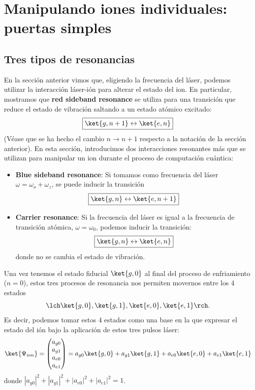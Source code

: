 \section{Manipulando iones individuales: puertas simples} \label{sec_ions_single_ion}

\subsection{Tres tipos de resonancias}

En la sección anterior vimos que, eligiendo la frecuencia del láser, podemos utilizar la interacción láser-ión para alterar el estado del ion. En particular, mostramos que \textbf{red sideband resonance} se utiliza para una transición que reduce el estado de vibración saltando a un estado atómico excitado:
	\begin{equation}
	\boxed{\ket{g,n+1} \leftrightarrow \ket{e,n}}
	\end{equation}
(Véase que se ha hecho el cambio $n \rightarrow n+1$ respecto a la notación de la sección anterior). 
 En esta sección, introducimos dos interacciones resonantes más que se utilizan para manipular un ion durante el proceso de computación cuántica:

\begin{itemize}
\item \textbf{Blue sideband resonance}: Si tomamos como frecuencia del láser $\omega = \omega_o + \omega_z$, se puede inducir la transición
	\begin{equation}
	\boxed{\ket{g,n} \leftrightarrow \ket{e,n+1}}
	\end{equation}
	
\item \textbf{Carrier resonance}: Si la frecuencia del láser es igual a la frecuencia de transición atómica, $\omega = \omega_0$, podemos inducir la transición:
	\begin{equation}
	\boxed{\ket{g,n} \leftrightarrow \ket{e,n}}
	\end{equation}
donde no se cambia el estado de vibración.
\end{itemize} 

Una vez tenemos el estado fiducial $\ket{g,0}$ al final del proceso de enfriamiento ($n=0$), estos tres procesos de resonancia nos permiten movernos entre los 4 estados 
	\begin{equation}
	\lch \ket{g,0}, \ket{g,1}, \ket{e,0}, \ket{e,1} \rch.
	\end{equation}
Es decir, podemos tomar estos 4 estados como una base en la que expresar el estado del ión bajo la aplicación de estos tres pulsos láser:
	\begin{equation} \label{ec_ions_psi_1_ions}
	\ket{\Psi_{ion}} = \begin{pmatrix} a_{g0} \\ a_{g1} \\ a_{e0} \\ a_{e1} \end{pmatrix} = 
	a_{g0} \ket{g,0} + a_{g1} \ket{g,1} + a_{e0} \ket{e,0} + a_{e1} \ket{e,1} 
	\end{equation}
donde $|a_{g0}|^2+|a_{g1}|^2+|a_{e0}|^2+|a_{e1}|^2 = 1$.

